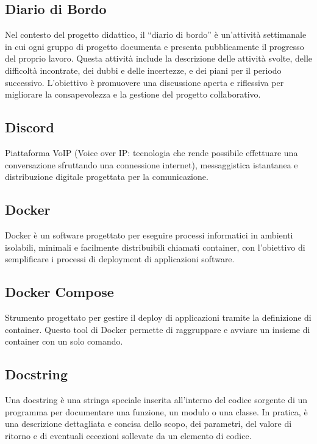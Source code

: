 \hypertarget{sec:diario_di_bordo}{}
\subsection*{Diario di Bordo}
Nel contesto del progetto didattico, il “diario di bordo” è un’attività settimanale in cui ogni gruppo di progetto documenta e presenta pubblicamente il progresso del proprio lavoro. 
Questa attività include la descrizione delle attività svolte, delle difficoltà incontrate, dei dubbi e delle incertezze, e dei piani per il periodo successivo. 
L’obiettivo è promuovere una discussione aperta e riflessiva per migliorare la consapevolezza e la gestione del progetto collaborativo.

\subsection*{Discord}
Piattaforma VoIP (Voice over IP: tecnologia che rende possibile effettuare una conversazione sfruttando una connessione internet), messaggistica istantanea 
e distribuzione digitale progettata per la comunicazione.

\hypertarget{sec:docker}{}
\subsection*{Docker}
Docker è un software progettato per eseguire processi informatici in ambienti isolabili, minimali e facilmente distribuibili chiamati 
container, con l’obiettivo di semplificare i processi di deployment di applicazioni software.

\hypertarget{sec:docker_compose}{}
\subsection*{Docker Compose}
Strumento progettato per gestire il deploy di applicazioni tramite la definizione di
container. Questo tool di Docker permette di raggruppare e avviare un insieme di
container con un solo comando.


\hypertarget{sec:docstring}{}
\subsection*{Docstring}
Una docstring è una stringa speciale inserita all'interno del codice sorgente di un programma per documentare una funzione, un modulo 
o una classe. In pratica, è una descrizione dettagliata e concisa dello scopo, dei parametri, del valore di ritorno e di eventuali 
eccezioni sollevate da un elemento di codice.


